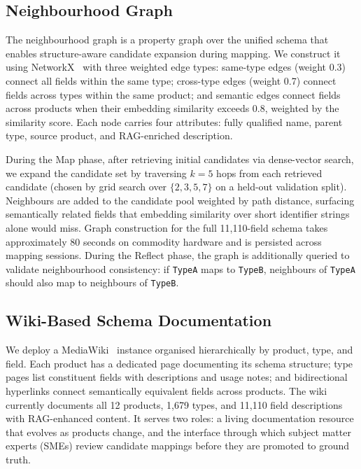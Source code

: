 \documentclass[sigconf, nonacm]{acmart}
\begin{document}
\subsection{Neighbourhood Graph}
\label{sec:nbr_graph}

The neighbourhood graph is a property graph over the unified schema
that enables structure-aware candidate expansion during mapping.
We construct it using NetworkX~\cite{hagberg2008networkx} with three
weighted edge types:
same-type edges (weight 0.3) connect all fields within the same type;
cross-type edges (weight 0.7) connect fields across types within the
same product; and semantic edges connect fields across products when
their embedding similarity exceeds 0.8, weighted by the similarity score.
Each node carries four attributes: fully qualified name, parent type,
source product, and RAG-enriched description.

During the Map phase, after retrieving initial candidates via
dense-vector search, we expand the candidate set by traversing
$k{=}5$ hops from each retrieved candidate (chosen by grid search
over $\{2,3,5,7\}$ on a held-out validation split).
Neighbours are added to the candidate pool weighted by path distance,
surfacing semantically related fields that embedding similarity over
short identifier strings alone would miss.
Graph construction for the full 11,110-field schema takes
approximately 80 seconds on commodity hardware and is persisted
across mapping sessions.
During the Reflect phase, the graph is additionally queried to
validate neighbourhood consistency: if \texttt{TypeA} maps to
\texttt{TypeB}, neighbours of \texttt{TypeA} should also map to
neighbours of \texttt{TypeB}.

\subsection{Wiki-Based Schema Documentation}

We deploy a MediaWiki~\cite{mediawiki} instance organised hierarchically
by product, type, and field. Each product has a dedicated page
documenting its schema structure; type pages list constituent fields
with descriptions and usage notes; and bidirectional hyperlinks connect
semantically equivalent fields across products. The wiki currently
documents all 12 products, 1,679 types, and 11,110 field descriptions
with RAG-enhanced content. It serves two roles: a living documentation
resource that evolves as products change, and the interface through which
subject matter experts (SMEs) review candidate mappings before they are
promoted to ground truth.
\end{document}
